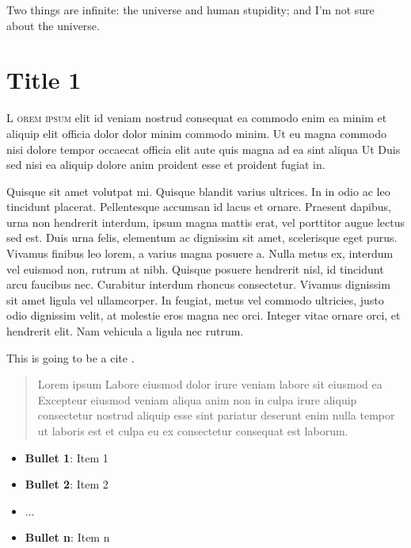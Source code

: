 
\begin{savequote}[80mm]
    {\color{stdgrey}Two things are infinite: the universe and human stupidity; and I'm not sure about the universe.}

\end{savequote}

\chapter{Title 1}
\label{chap:first_chapter}

    \lettrine[lines=4,findent=5pt]{\textcolor{stdgrey}{L}}{ orem ipsum} elit id veniam nostrud consequat ea commodo enim ea minim et aliquip elit officia dolor dolor minim commodo minim. Ut eu magna commodo nisi dolore tempor occaecat officia elit aute quis magna ad ea sint aliqua Ut Duis sed nisi ea aliquip dolore anim proident esse et proident fugiat in.

    Quisque sit amet volutpat mi. Quisque blandit varius ultrices. In in odio ac leo tincidunt placerat. Pellentesque accumsan id lacus et ornare. Praesent dapibus, urna non hendrerit interdum, ipsum magna mattis erat, vel porttitor augue lectus sed est. Duis urna felis, elementum ac dignissim sit amet, scelerisque eget purus. Vivamus finibus leo lorem, a varius magna posuere a. Nulla metus ex, interdum vel euismod non, rutrum at nibh. Quisque posuere hendrerit nisl, id tincidunt arcu faucibus nec. Curabitur interdum rhoncus consectetur. Vivamus dignissim sit amet ligula vel ullamcorper. In feugiat, metus vel commodo ultricies, justo odio dignissim velit, at molestie eros magna nec orci. Integer vitae ornare orci, et hendrerit elit. Nam vehicula a ligula nec rutrum.

    This is going to be a cite \cite{einstein_can_1935}.

    \blockquote{Lorem ipsum Labore eiusmod dolor irure veniam labore sit eiusmod ea Excepteur eiusmod veniam aliqua anim non in culpa irure aliquip consectetur nostrud aliquip esse sint pariatur deserunt enim nulla tempor ut laboris est et culpa eu ex consectetur consequat est laborum.}

    \begin{itemize}
        \item \textbf{Bullet 1}: Item 1

        \item \textbf{Bullet 2}: Item 2

        \item ...

        \item \textbf{Bullet n}: Item n
    \end{itemize}

